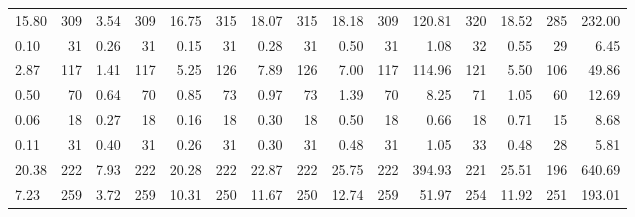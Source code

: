 \begin{table*}
\begin{adjustbox}{width=\textwidth}
\begin{minipage}[b]{\textwidth}
\begin{tabular}{@{} lrrrrrrrrrrrrrr @{}}
15.80 & 309 & 3.54 & 309 & 16.75 & 315 & 18.07 & 315 & 18.18 & 309 & 120.81 & 320 & 18.52 & 285 & 232.00 \\
0.10 & 31 & 0.26 & 31 & 0.15 & 31 & 0.28 & 31 & 0.50 & 31 & 1.08 & 32 & 0.55 & 29 & 6.45 \\
2.87 & 117 & 1.41 & 117 & 5.25 & 126 & 7.89 & 126 & 7.00 & 117 & 114.96 & 121 & 5.50 & 106 & 49.86 \\
0.50 & 70 & 0.64 & 70 & 0.85 & 73 & 0.97 & 73 & 1.39 & 70 & 8.25 & 71 & 1.05 & 60 & 12.69 \\
0.06 & 18 & 0.27 & 18 & 0.16 & 18 & 0.30 & 18 & 0.50 & 18 & 0.66 & 18 & 0.71 & 15 & 8.68 \\
0.11 & 31 & 0.40 & 31 & 0.26 & 31 & 0.30 & 31 & 0.48 & 31 & 1.05 & 33 & 0.48 & 28 & 5.81 \\
20.38 & 222 & 7.93 & 222 & 20.28 & 222 & 22.87 & 222 & 25.75 & 222 & 394.93 & 221 & 25.51 & 196 & 640.69 \\
7.23 & 259 & 3.72 & 259 & 10.31 & 250 & 11.67 & 250 & 12.74 & 259 & 51.97 & 254 & 11.92 & 251 & 193.01 \\
\bottomrule
\end{tabular}
\end{minipage}
\end{adjustbox}
\end{table*}